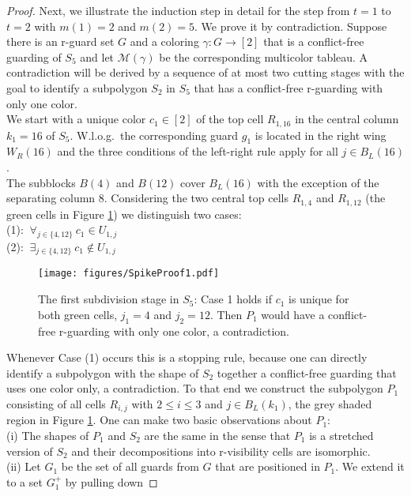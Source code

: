 \documentclass[a4paper,USenglish,numberwithinsect]{lipics}
\theoremstyle{plain}
\begin{document}
\begin{proof}
Next, we illustrate the induction step in detail for the step from
 $t=1$ to $t=2$ with $m(1)=2$ and $m(2)=5$. We prove it by contradiction.
Suppose there  is an r-guard set $G$ and a
coloring $\gamma: G \rightarrow [2]$ that is a conflict-free guarding of $S_{5}$
and let $\mathcal{M}(\gamma)$ be the corresponding  multicolor tableau.
A contradiction will be derived by  a sequence of at most two
cutting stages with the goal to identify a subpolygon $S_{2}$ in $S_5$ that has a
conflict-free r-guarding with only one  color.\\
We start with a unique color $c_1 \in [2]$ of the top cell $R_{1,16}$ in the central column
$k_1=16$ of $S_{5}$. W.l.o.g.~the corresponding guard $g_1$ is located in the right wing
$W_R(16)$ and the three conditions of the left-right rule apply for all $j \in B_L(16)$. \\ 
The  subblocks $B(4)$ and $B(12)$  cover $B_L(16)$ with the exception
of the separating column $8$.  Considering the two central top cells $R_{1,4}$ and $R_{1,12}$
(the green cells in  Figure \ref{r-vis-indStep1})
 we distinguish  two cases:\\
  (1): $\ \forall_{j \in \{4,12\}}\ c_1 \in U_{1,j}$\\
  (2): $\ \exists_{j \in \{4,12\}} \ c_1 \not\in U_{1,j}$\\
\begin{figure}
\centering
    \texttt{[image: figures/SpikeProof1.pdf]}
\caption{The first subdivision stage in $S_5$: Case 1 holds if  $c_1$ is
unique for both green cells, $j_1=4$ and $j_2=12$.
Then $P_1$ would have a conflict-free r-guarding with only one color, a
contradiction.}
\label{r-vis-indStep1}
\end{figure}
Whenever Case (1) occurs  this is a stopping
rule, because  one can directly identify a subpolygon  with the
shape of $S_{2}$ together a conflict-free guarding that uses  one color only, a contradiction.
To that end we construct the subpolygon $P_1$ consisting of all cells
$R_{i,j}$ with $2 \leq i \leq 3$ and $j \in B_L(k_1)$, the  grey shaded region 
in Figure \ref{r-vis-indStep1}.
One can make two basic observations about $P_1$:
\\
(i) The shapes of $P_1$ and  $S_{2}$ are the same in the sense that 
$P_1$ is a stretched version of $S_2$ and their
decompositions  into r-visibility cells are isomorphic. 
\\
(ii) Let $G_1$ be the set of all guards from $G$ that  are positioned in
$P_1$. We extend it to a
set $G_1^{+}$ by pulling down

\end{proof}
\end{document}
